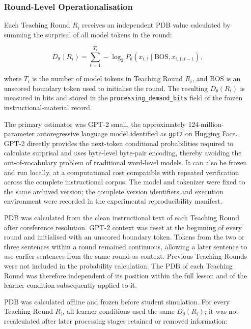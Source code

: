 \subsubsection{Round-Level Operationalisation}
\label{subsubsec:pdb-round-operationalisation}

Each Teaching Round $R_i$ receives an independent PDB value calculated by summing the surprisal of all model tokens in the round:

\[
D_\theta(R_i)=\sum_{t=1}^{T_i}-\log_2 P_\theta\!\left(x_{i,t}\mid \mathrm{BOS},x_{i,1:t-1}\right),
\]

where $T_i$ is the number of model tokens in Teaching Round $R_i$, and $\mathrm{BOS}$ is an unscored boundary token used to initialise the round. The resulting $D_\theta(R_i)$ is measured in bits and stored in the \texttt{processing\_demand\_bits} field of the frozen instructional-material record.

The primary estimator was GPT-2 small, the approximately 124-million-parameter autoregressive language model identified as \texttt{gpt2} on Hugging Face. GPT-2 directly provides the next-token conditional probabilities required to calculate surprisal and uses byte-level byte-pair encoding, thereby avoiding the out-of-vocabulary problem of traditional word-level models. It can also be frozen and run locally, at a computational cost compatible with repeated verification across the complete instructional corpus. The model and tokenizer were fixed to the same archived version; the complete version identifiers and execution environment were recorded in the experimental reproducibility manifest.

PDB was calculated from the clean instructional text of each Teaching Round after coreference resolution. GPT-2 context was reset at the beginning of every round and initialised with an unscored boundary token. Tokens from the two or three sentences within a round remained continuous, allowing a later sentence to use earlier sentences from the same round as context. Previous Teaching Rounds were not included in the probability calculation. The PDB of each Teaching Round was therefore independent of its position within the full lesson and of the learner condition subsequently applied to it.

PDB was calculated offline and frozen before student simulation. For every Teaching Round $R_i$, all learner conditions used the same $D_\theta(R_i)$; it was not recalculated after later processing stages retained or removed information:


